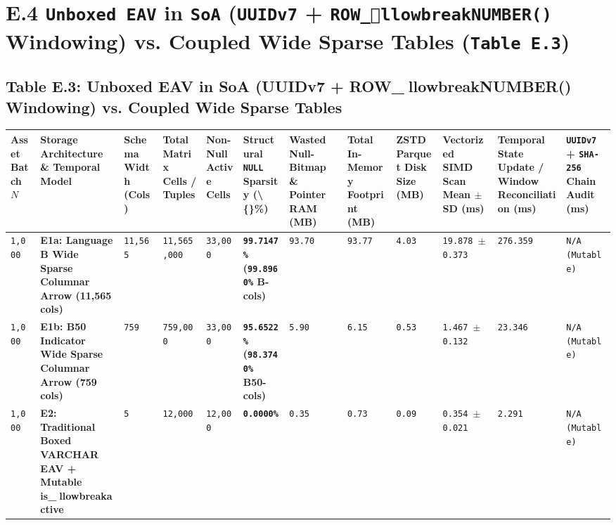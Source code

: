 \documentclass[10pt,a4paper]{article}
\begin{document}
\section*{E.4 \texttt{Unboxed EAV} in \texttt{SoA} (\texttt{UUIDv7} + \texttt{ROW\_llowbreak{}NUMBER()} Windowing) vs. Coupled Wide Sparse Tables (\texttt{Table E.3})}

\subsection*{Table E.3: Unboxed EAV in SoA (UUIDv7 + ROW\_llowbreak{}NUMBER() Windowing) vs. Coupled Wide Sparse Tables}

{\scriptsize
\begin{longtable}{p{}p{}p{}p{}p{}p{}p{}p{}p{}p{}p{}p{}}
\toprule
\textbf{Asset Batch $N$} & \textbf{Storage Architecture \& Temporal Model} & \textbf{Schema Width (Cols)} & \textbf{Total Matrix Cells / Tuples} & \textbf{Non-Null Active Cells} & \textbf{Structural \texttt{NULL} Sparsity (\textbackslash\{\}\%)} & \textbf{Wasted Null-Bitmap \& Pointer RAM (MB)} & \textbf{Total In-Memory Footprint (MB)} & \textbf{ZSTD Parquet Disk Size (MB)} & \textbf{Vectorized SIMD Scan Mean $\pm$ SD (ms)} & \textbf{Temporal State Update / Window Reconciliation (ms)} & \textbf{\texttt{UUIDv7} + \texttt{SHA-256} Chain Audit (ms)} \\
\midrule
\endhead
\texttt{1,000} & \textbf{E1a: Language B Wide Sparse Columnar Arrow (11,565 cols)} & \texttt{11,565} & \texttt{11,565,000} & \texttt{33,000} & \textbf{\texttt{99.7147\%} (\texttt{99.8960\%} B-cols)} & \texttt{93.70} & \texttt{93.77} & \texttt{4.03} & \texttt{19.878 $\pm$ 0.373} & \texttt{276.359} & \texttt{N/A (Mutable)} \\
\texttt{1,000} & \textbf{E1b: B50 Indicator Wide Sparse Columnar Arrow (759 cols)} & \texttt{759} & \texttt{759,000} & \texttt{33,000} & \textbf{\texttt{95.6522\%} (\texttt{98.3740\%} B50-cols)} & \texttt{5.90} & \texttt{6.15} & \texttt{0.53} & \texttt{1.467 $\pm$ 0.132} & \texttt{23.346} & \texttt{N/A (Mutable)} \\
\texttt{1,000} & \textbf{E2: Traditional Boxed VARCHAR EAV + Mutable is\_llowbreak{}active} & \texttt{5} & \texttt{12,000} & \texttt{12,000} & \textbf{\texttt{0.0000\%}} & \texttt{0.35} & \texttt{0.73} & \texttt{0.09} & \texttt{0.354 $\pm$ 0.021} & \texttt{2.291} & \texttt{N/A (Mutable)} \\

\end{longtable}}
\end{document}
